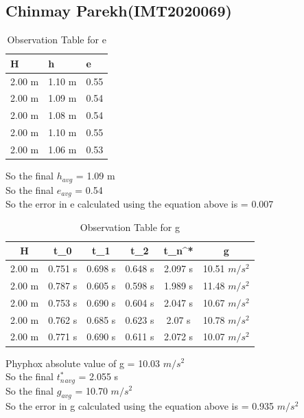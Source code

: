 \documentclass[11pt]{scrartcl} %
\begin{document}
\newpage
\subsection{Chinmay Parekh(IMT2020069)}

\begin{table}[h] %
	\centering %
	\begin{tabular}{l l l}
		\toprule
		\textbf{H} & \textbf{h} & \textbf{e} \\
		\midrule
		2.00 m & 1.10 m & 0.55\\
        2.00 m & 1.09 m  & 0.54\\
        2.00 m & 1.08 m  & 0.54\\
        2.00 m & 1.10 m & 0.55 \\
        2.00 m & 1.06 m & 0.53 \\
		\bottomrule
	\end{tabular}
	\caption{Observation Table for e}
\end{table}
So the final $h_{avg}$ = 1.09 m\\
So the final $e_{avg}$ = 0.54\\
So the error in e calculated using the equation above is  = 0.007

\begin{table}[h]
\centering
\begin{tabular}{||c c c c c c||} 
\toprule
 \hline
 H & t_0 & t_1 & t_2 & t_n^* & g \\ [0.5ex] 
 \midrule
 \hline\hline
 2.00 m & 0.751 s & 0.698 s  & 0.648 s & 2.097 s & 10.51 $m/s^2$  \\ 
 \hline
 2.00 m & 0.787 s & 0.605 s & 0.598 s & 1.989 s & 11.48 $m/s^2$  \\
 \hline
 2.00 m & 0.753 s & 0.690 s & 0.604 s & 2.047 s  & 10.67 $m/s^2$   \\
 \hline
 2.00 m & 0.762 s & 0.685 s & 0.623 s & 2.07 s  & 10.78 $m/s^2$   \\
 \hline
 2.00 m & 0.771 s & 0.690 s & 0.611 s & 2.072 s  & 10.07 $m/s^2$  \\ [1ex]
 \bottomrule
 \hline
\end{tabular}
\caption{Observation Table for g}
\end{table}
Phyphox absolute value of g = 10.03 $m/s^2$\\
So the final $t_n^*_{avg}$ = 2.055 s\\
So the final $g_{avg}$ = 10.70 $m/s^2$\\
So the error in g calculated using the equation above is  = 0.935 $m/s^2$\\
\end{document}
